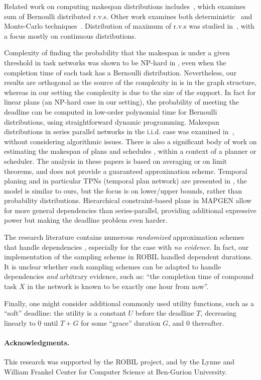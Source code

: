 \documentclass{article}
\begin{document}
Related work on computing makespan distributions includes~\cite{hong2013computing}, which examines sum of  Bernoulli distributed r.v.s.
Other work examines both deterministic~\cite{mercier2007discrete} and  Monte-Carlo techniques~\cite{bucher1988adaptive,lipton1990practical}. 
Distribution of maximum of r.v.s was studied in~\cite{devroye1980generating}, with a focus mostly on continuous distributions.

Complexity of finding the probability that the makespan is under a given threshold in task networks was shown to
be NP-hard in \cite{hagstrom1988computational}, even when the completion time of each task has a Bernoulli distribution.
Nevertheless, our results are orthogonal as the source of the complexity in \cite{hagstrom1988computational} is in the graph structure,
whereas in our setting the complexity is due to the size of the support. In fact for linear plans (an NP-hard case in our setting),
the probability of meeting the deadline can be computed in low-order polynomial time for Bernoulli distributions, using straightforward dynamic programming.
Makespan distributions in series parallel networks in the i.i.d. case was examined in~\cite{gutjahr1992average}, without   
considering algorithmic issues. There is also a significant body of work on estimating the makespan of plans and schedules
\cite{herroelen2005project,fu2010towards,beck2007proactive}, within a context of a planner or scheduler. The analysis in these papers is
based on averaging or on limit theorems, and does not provide a guaranteed approximation scheme. 
Temporal planing and in particular TPNs (temporal plan network) are presented in
\cite{kim2001executing}, the model is similar to ours, but the focus is on lower/upper bounds, rather than probability distributions. 
Hierarchical constraint-based plans in MAPGEN \cite{bresina2005mixed} allow for more
general dependencies than series-parallel, providing additional expressive power but making the deadline problem even harder.

The research literature contains numerous {\em randomized} approximation schemes that handle dependencies \cite{Pearl,Yuan20061189}, especially for
the case with {\em no evidence}. In fact, our implementation of the sampling scheme in ROBIL handled dependent durations.
It is unclear whether such sampling schemes can be adapted to handle dependencies {\em and} arbitrary evidence, such as: ``the completion time of
compound task $X$ in the network is known to be exactly one hour from now''.


Finally, one might consider additional commonly used utility functions, such as a ``soft'' deadline: the utility is a constant $U$ before the deadline $T$, decreasing linearly to 0
until $T+G$ for some ``grace'' duration $G$, and 0 thereafter.
\paragraph{Acknowledgments.} This research was supported by the ROBIL project, and by the Lynne and William Frankel Center for Computer Science at Ben-Gurion University.
\small


\end{document}
